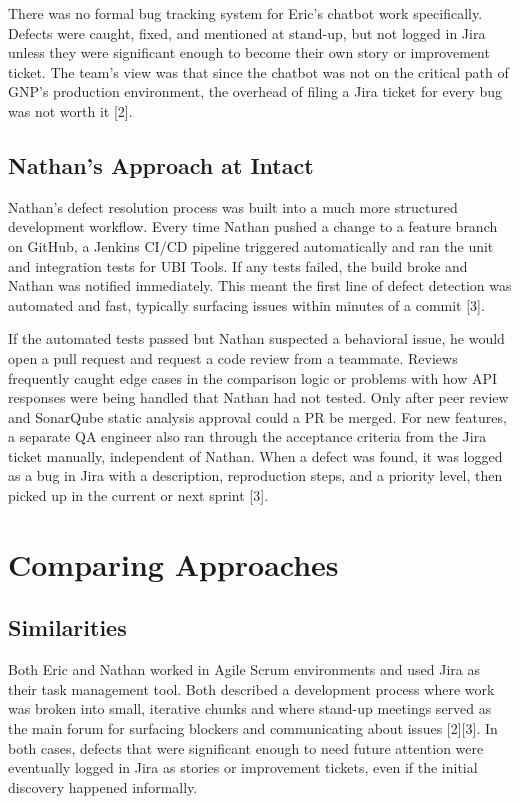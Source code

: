 \documentclass[sigconf]{acmart}
\begin{document}
There was no formal bug tracking system for Eric's chatbot work specifically. Defects were caught, fixed, and mentioned at stand-up, but not logged in Jira unless they were significant enough to become their own story or improvement ticket. The team's view was that since the chatbot was not on the critical path of GNP's production environment, the overhead of filing a Jira ticket for every bug was not worth it [2].

\subsection{Nathan's Approach at Intact}

Nathan's defect resolution process was built into a much more structured development workflow. Every time Nathan pushed a change to a feature branch on GitHub, a Jenkins CI/CD pipeline triggered automatically and ran the unit and integration tests for UBI Tools. If any tests failed, the build broke and Nathan was notified immediately. This meant the first line of defect detection was automated and fast, typically surfacing issues within minutes of a commit [3].

If the automated tests passed but Nathan suspected a behavioral issue, he would open a pull request and request a code review from a teammate. Reviews frequently caught edge cases in the comparison logic or problems with how API responses were being handled that Nathan had not tested. Only after peer review and SonarQube static analysis approval could a PR be merged. For new features, a separate QA engineer also ran through the acceptance criteria from the Jira ticket manually, independent of Nathan. When a defect was found, it was logged as a bug in Jira with a description, reproduction steps, and a priority level, then picked up in the current or next sprint [3].

\section{Comparing Approaches}

\subsection{Similarities}

Both Eric and Nathan worked in Agile Scrum environments and used Jira as their task management tool. Both described a development process where work was broken into small, iterative chunks and where stand-up meetings served as the main forum for surfacing blockers and communicating about issues [2][3]. In both cases, defects that were significant enough to need future attention were eventually logged in Jira as stories or improvement tickets, even if the initial discovery happened informally.
\end{document}
